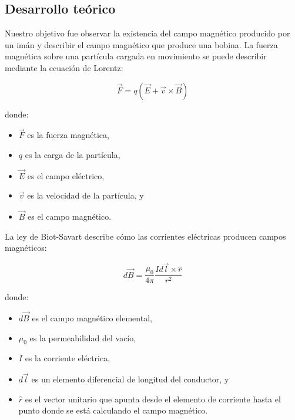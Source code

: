 \documentclass{article}
\begin{document}

\begin{multicols}{2}
\section{Desarrollo teórico}\label{Desarrollo Teorico}                              	%
Nuestro objetivo fue observar la existencia del campo magnético producido por un imán y describir el campo magnético que produce una bobina. 
\cite{Porto}
La fuerza magnética sobre una partícula cargada en movimiento se puede describir mediante la ecuación de Lorentz:

\begin{equation}
\vec{F} = q(\vec{E} + \vec{v} \times \vec{B})
\end{equation}

donde:
\begin{itemize}
\item $\vec{F}$ es la fuerza magnética,
\item $q$ es la carga de la partícula,
\item $\vec{E}$ es el campo eléctrico,
\item $\vec{v}$ es la velocidad de la partícula, y
\item $\vec{B}$ es el campo magnético.
\end{itemize}


La ley de Biot-Savart describe cómo las corrientes eléctricas producen campos magnéticos:

\begin{equation}
d\vec{B} = \frac{\mu_0}{4\pi} \frac{Id\vec{l} \times \hat{r}}{r^2}
\end{equation}

donde:
\begin{itemize}
\item $d\vec{B}$ es el campo magnético elemental,
\item $\mu_0$ es la permeabilidad del vacío,
\item $I$ es la corriente eléctrica,
\item $d\vec{l}$ es un elemento diferencial de longitud del conductor, y
\item $\hat{r}$ es el vector unitario que apunta desde el elemento de corriente hasta el punto donde se está calculando el campo magnético.
\end{itemize}


\end{multicols}
\end{document}

